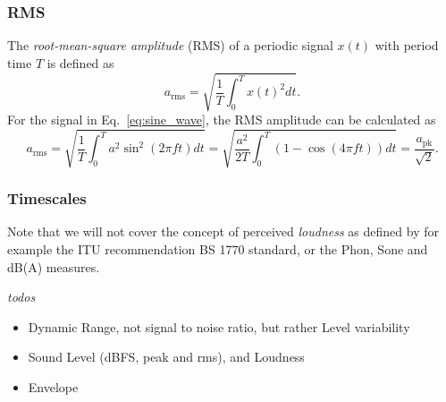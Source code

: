 \documentclass[../main2.tex]{subfiles}
\begin{document}
\subsubsection{RMS}
The \emph{root-mean-square amplitude} (RMS) of a periodic signal $x(t)$ with period time $T$ is defined as
\begin{equation}
a_\text{rms} = \sqrt{ \frac{1}{T} \int_{0}^{T} x(t)^2 dt }.
\end{equation}
For the signal in Eq.~\eqref{eq:sine_wave}, the RMS amplitude can be calculated as
\begin{equation}
a_\text{rms} =
\sqrt{ \frac{1}{T} \int_{0}^{T} a^2 \sin^2 (2 \pi f t) dt } =
\sqrt{ \frac{a^2}{2T} \int_{0}^{T}\left( 1 - \cos (4 \pi f t) \right) dt } =
\frac{a_\text{pk}}{\sqrt 2}.
\end{equation}


\subsubsection{Timescales}
Note that we will not cover the concept of perceived \emph{loudness} as defined by for example the ITU recommendation BS 1770 standard, or the Phon, Sone and dB(A) measures.

\emph{todos}
\begin{itemize}
	\item Dynamic Range, not signal to noise ratio, but rather Level variability
	\item Sound Level (dBFS, peak and rms), and Loudness
	\item Envelope
\end{itemize}
\end{document}
